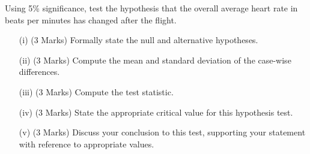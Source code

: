 \documentclass[a4paper,12pt]{article}
\begin{document}
Using 5\% significance, test the hypothesis that the overall average heart rate
in beats per minutes has changed after the flight. 
\begin{itemize}
	\item[(i)](3 Marks) Formally state the null and alternative hypotheses.
	\item[(ii)] (3 Marks) Compute the mean and standard deviation of the case-wise differences.
	\item[(iii)](3 Marks) Compute the test statistic.
	\item[(iv)](3 Marks) State the appropriate critical value for this hypothesis test.
	\item[(v)](3 Marks) Discuss your conclusion to this test, supporting your statement with reference to appropriate values.
\end{itemize}
%
%	
\end{document}
